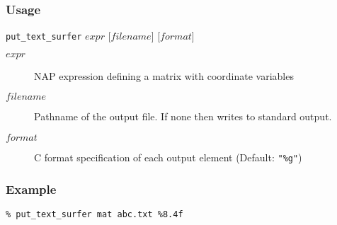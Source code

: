   \subsubsection{Usage}

  \texttt{put\_text\_surfer} $expr$ [$filename$] [$format$]
  \begin{description}
    \item[$expr$]
    NAP expression defining a matrix with coordinate variables
    \item[$filename$]
    Pathname of the output file. If none then writes to standard output.
    \item[$format$]
    C format specification of each output element (Default: \texttt{"\%g"})
  \end{description}

  \subsubsection{Example}

  \texttt{\% put\_text\_surfer mat abc.txt \%8.4f}
